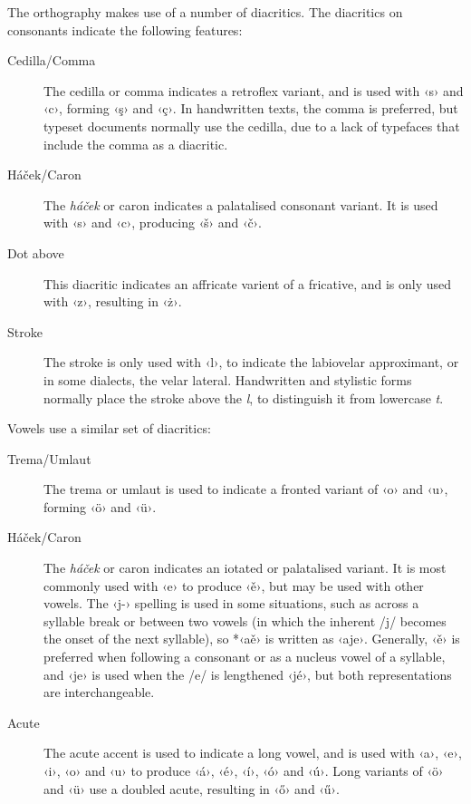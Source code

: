 \documentclass[grammar]{subfiles}
\begin{document}
  \pagebreak[2]
  The orthography makes use of a number of diacritics. The diacritics on consonants indicate the following features:

  \begin{description}
    \item[Cedilla/Comma] The cedilla or comma indicates a retroflex variant, and is used with ‹s› and ‹c›, forming ‹ş› and ‹ç›. In handwritten texts, the comma is preferred, but typeset documents normally use the cedilla, due to a lack of typefaces that include the comma as a diacritic.
    \item[Háček/Caron] The \emph{háček} or caron indicates a palatalised consonant variant. It is used with ‹s› and ‹c›, producing ‹š› and ‹č›.
    \item[Dot above] This diacritic indicates an affricate varient of a fricative, and is only used with ‹z›, resulting in ‹ż›.
    \item[Stroke] The stroke is only used with ‹l›, to indicate the labiovelar approximant, or in some dialects, the velar lateral. Handwritten and stylistic forms normally place the stroke above the \emph l, to distinguish it from lowercase \emph t.
  \end{description}

  \pagebreak[2]
  Vowels use a similar set of diacritics:

  \begin{description}
    \item[Trema/Umlaut] The trema or umlaut is used to indicate a fronted variant of ‹o› and ‹u›, forming ‹ö› and ‹ü›.
    \item[Háček/Caron]\label{def:hacek} The \emph{háček} or caron indicates an iotated or palatalised variant. It is most commonly used with ‹e› to produce ‹ě›, but may be used with other vowels. The ‹j-› spelling is used in some situations, such as across a syllable break or between two vowels (in which the inherent /j/ becomes the onset of the next syllable), so *‹aě› is written as ‹aje›. Generally, ‹ě› is preferred when following a consonant or as a nucleus vowel of a syllable, and ‹je› is used when the /e/ is lengthened ‹jé›, but both representations are interchangeable.
    \item[Acute] The acute accent is used to indicate a long vowel, and is used with ‹a›, ‹e›, ‹i›, ‹o› and ‹u› to produce ‹á›, ‹é›, ‹í›, ‹ó› and ‹ú›. Long variants of ‹ö› and ‹ü› use a doubled acute, resulting in ‹ő› and ‹ű›. 
  \end{description}
\end{document}
